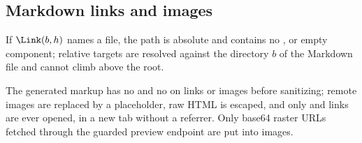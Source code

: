 \subsection{Markdown links and images}

\begin{law}
\label{law:link-path}
If $\Link(b,h)$ names a file, the path is absolute and contains no ,
 or empty component; relative targets are resolved against the
directory $b$ of the Markdown file and cannot climb above the root.
\end{law}

\begin{law}
\label{law:link-inert}
The generated markup has no  and no  on links or images
before sanitizing; remote images are replaced by a placeholder, raw HTML is
escaped, and only  and  links are ever opened, in a new
tab without a referrer.  Only base64 raster  URLs fetched through the
guarded preview endpoint are put into images.
\end{law}
